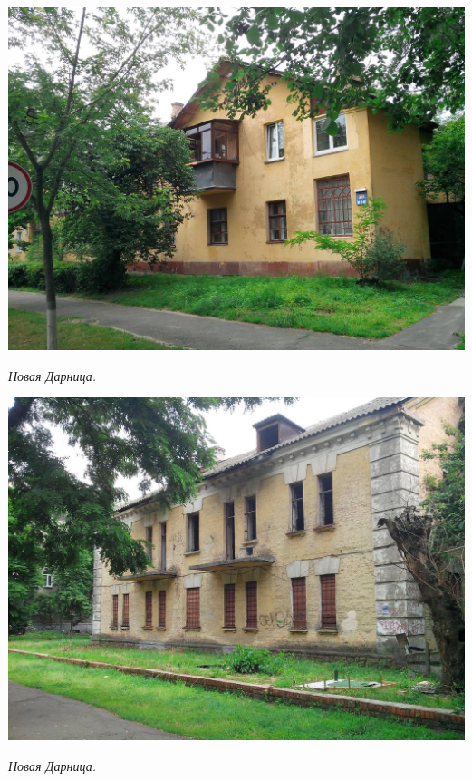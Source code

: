 \begin{center}
\includegraphics[width=\linewidth]{lpix/IMG_20160613_143641.jpg}

\textit{Новая Дарница.}
\end{center}
\newpage


\begin{center}
\includegraphics[width=\linewidth]{lpix/IMG_20160613_143848.jpg}

\textit{Новая Дарница.}
\end{center}

